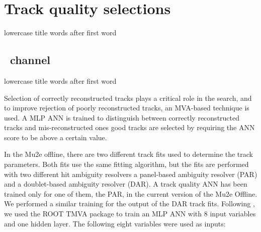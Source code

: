 

\section{Track quality selections}
{\blue lowercase title words after first word}

\subsection{\MuToEm\  channel}
\label{sec:mumem_channel}
{\blue lowercase title words after first word}

Selection of correctly reconstructed tracks plays a critical role in the search, and 
to improve rejection of poorly reconstructed  tracks, an MVA-based technique is used.
A MLP ANN is trained to distinguish between correctly reconstructed tracks
and mis-reconstructed ones\strike{,}{\blue ;} good tracks are selected by requiring the ANN 
score to be above {\blue a} certain value.

In the Mu2e offline, 
{\blue there are two different track fits} used to determine the track parameters.
Both  {\blue fits use} the same fitting algorithm, but the fits are 
performed with two different hit ambiguity resolvers\strike{,}{\blue -} a panel-based ambiguity 
resolver {\blue (PAR)} and a doublet-based ambiguity resolver
{\blue (DAR)}. A track quality ANN has been trained only for one of them,
the PAR{\blue , in the current version of the Mu2e Offline}. 
%
We performed a similar training for the output of the DAR track fits.
%
Following \cite{MU2E_4595_ANN_TRAINING}, we used {\blue the} ROOT TMVA package to train a{\blue n}
MLP ANN with 8 input variables and one hidden layer. The following eight variables were used
as inputs:

